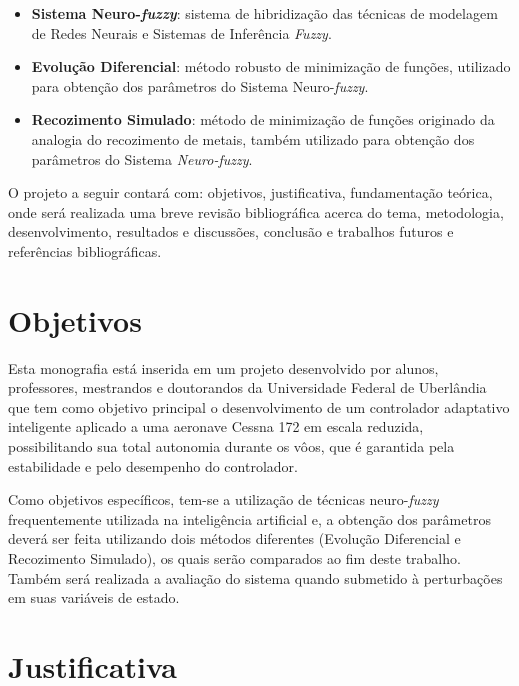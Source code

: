 \documentclass[10pt,a4paper]{article}
\numberwithin{equation}{section}
\begin{document}
\begin{itemize}
\item \textbf{Sistema Neuro-\textit{fuzzy}}: sistema de hibridização das técnicas de modelagem de Redes Neurais e Sistemas de Inferência \textit{Fuzzy}.
\item \textbf{Evolução Diferencial}: método robusto de minimização de funções, utilizado para obtenção dos parâmetros do Sistema Neuro-\textit{fuzzy}. 
\item \textbf{Recozimento Simulado}: método de minimização de funções originado da analogia do recozimento de metais, também utilizado para obtenção dos parâmetros do Sistema \textit{Neuro-\textit{fuzzy}}.
\end{itemize}

\par O projeto a seguir contará com: objetivos, justificativa, fundamentação teórica, onde será realizada uma breve revisão bibliográfica acerca do tema, metodologia, desenvolvimento, resultados e discussões, conclusão e trabalhos futuros e referências bibliográficas.

\newpage

\section{Objetivos}

\par Esta monografia está inserida em um projeto desenvolvido por alunos, professores, mestrandos e doutorandos da Universidade Federal de Uberlândia que tem como objetivo principal o desenvolvimento de um controlador adaptativo inteligente aplicado a uma aeronave Cessna 172 em escala reduzida, possibilitando sua total autonomia durante os vôos, que é garantida pela estabilidade e pelo desempenho do controlador.
\par Como objetivos específicos, tem-se a utilização de técnicas neuro-\textit{fuzzy} frequentemente utilizada na inteligência artificial e, a obtenção dos parâmetros deverá ser feita utilizando dois métodos diferentes (Evolução Diferencial e Recozimento Simulado), os quais serão comparados ao fim deste trabalho. Também será realizada a avaliação do sistema quando submetido à perturbações em suas variáveis de estado.


\newpage

\section{Justificativa}
\end{document}
